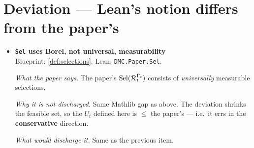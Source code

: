 \section*{Deviation --- Lean's notion differs from the paper's}
\begin{itemize}
  \item[] \textbf{\texttt{Sel} uses Borel, not universal, measurability}\\
  Blueprint: \ref{def:selections}. Lean: \texttt{DMC.Paper.Sel}.
  \par\smallskip\emph{What the paper says.} The paper's $\operatorname{Sel}(\mathcal R_t^{\Gamma_t})$ consists of \emph{universally} measurable selections.
  \par\smallskip\emph{Why it is not discharged.} Same Mathlib gap as above. The deviation shrinks the feasible set, so the $U_t$ defined here is $\le$ the paper's --- i.e.\ it errs in the \textbf{conservative} direction.
  \par\smallskip\emph{What would discharge it.} Same as the previous item.
\end{itemize}

